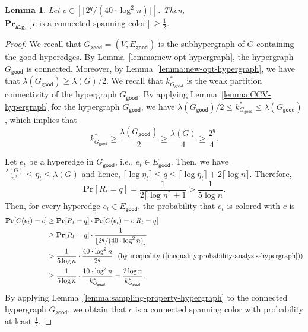 \documentclass[11pt]{article}
\newtheorem{lemma}{Lemma}
\theoremstyle{definition}
\newcommand{\good}{\mathsf{good}}
\begin{document}
\begin{lemma}\label{lemma:hypergraph-proper-color-probability}
    Let $c \in [\lfloor 2^q/(40\cdot \log ^2n) \rfloor]$. Then, $\mathbf{Pr}_{\texttt{Alg$_3$} }[c \text{ is a connected spanning color}]\geq \frac{1}{2}$.
\end{lemma}
\begin{proof}
    We recall that $G_{\good}=(V, E_{\texttt{good}})$ is the subhypergraph of $G$ containing the good hyperedges. By Lemma~\ref{lemma:new-opt-hypergraph}, the hypergraph $G_{\good}$ is connected. Moreover, by Lemma~\ref{lemma:new-opt-hypergraph}, we have that $\lambda(G_{\good})\geq \lambda(G)/2$.
    We recall that $k^*_{G_{\good}}$ is the weak partition connectivity of the hypergraph $G_{\good}$.
By applying Lemma~\ref{lemma:CCV-hypergraph} for the hypergraph $G_{\good}$, we have $\lambda(G_{\good})/2\leq k_{G_{\good}}^*\leq \lambda(G_{\good})$, which implies that
    $$k_{G_{\good}}^*\geq \frac{\lambda(G_{\good})}{2}\geq \frac{\lambda(G)}{4}\geq \frac{2^q}{4}.$$
    
    Let $e_t$ be a hyperedge in $G_{\good}$, i.e., $e_t\in E_{\good}$. Then, we have $\frac{\lambda(G)}{n^2}\leq \eta_t\leq \lambda(G)$ and hence, $\lceil \log \eta_t \rceil \leq q\leq \lceil \log \eta_t \rceil+2\lceil \log n \rceil$. Therefore,
    \begin{equation}\label{inequality:probability-analysis-hypergraph}
        \mathbf{Pr}[R_t=q]=\frac{1}{2\lceil \log n \rceil+1}>\frac{1}{5\log n}.
    \end{equation}
    Then, for every hyperedge $e_t\in E_{\good}$, the probability that $e_t$ is colored with $c$ is
    $$\begin{aligned}
        \mathbf{Pr}[C(e_t)=c] &\geq \mathbf{Pr}[R_t=q] \cdot \mathbf{Pr}[C(e_t)=c|R_t=q] \\
        &\geq \mathbf{Pr}[R_t=q] \cdot \frac{1}{\lfloor 2^q/(40\cdot \log ^2n) \rfloor} \\
        &> \frac{1}{5\log n}\cdot \frac{40\cdot \log^2n}{2^q} \ \ \text{(by inequality~(\ref{inequality:probability-analysis-hypergraph}))} \\
        &\geq \frac{1}{5\log n}\cdot \frac{10\cdot \log^2 n}{k_{G_{\good}}^*} = \frac{2\log n}{k_{G_{\good}}^*}.
    \end{aligned}$$
By applying Lemma~\ref{lemma:sampling-property-hypergraph} to the connected hypergraph $G_{\good}$, we obtain that $c$ is a connected spanning color with probability at least $\frac{1}{2}$. 
\end{proof}
\end{document}
